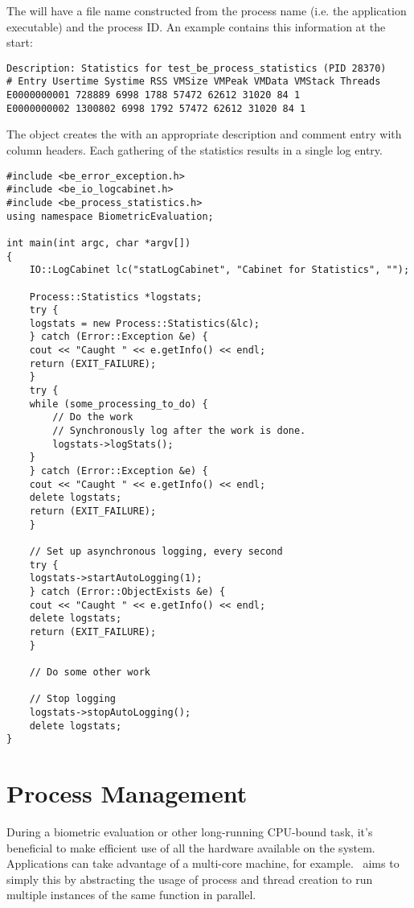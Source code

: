 The  will have a file name constructed from the process name (i.e.
the application executable) and the process ID. An example  contains
this information at the start:

\begin{verbatim}
Description: Statistics for test_be_process_statistics (PID 28370)
# Entry Usertime Systime RSS VMSize VMPeak VMData VMStack Threads
E0000000001 728889 6998 1788 57472 62612 31020 84 1
E0000000002 1300802 6998 1792 57472 62612 31020 84 1
\end{verbatim}

The  object creates the  with an appropriate description
and comment entry with column headers. Each gathering of the statistics results
in a single log entry.

\begin{lstlisting}[caption={Logging Process Statistics}, label=lst:processstatisticslogging]
#include <be_error_exception.h>
#include <be_io_logcabinet.h>
#include <be_process_statistics.h>
using namespace BiometricEvaluation;

int main(int argc, char *argv[])
{
    IO::LogCabinet lc("statLogCabinet", "Cabinet for Statistics", "");

    Process::Statistics *logstats;
    try {
	logstats = new Process::Statistics(&lc);
    } catch (Error::Exception &e) {
	cout << "Caught " << e.getInfo() << endl;
	return (EXIT_FAILURE);
    }
    try {
	while (some_processing_to_do) {
	    // Do the work
	    // Synchronously log after the work is done.
	    logstats->logStats();
	}
    } catch (Error::Exception &e) {
	cout << "Caught " << e.getInfo() << endl;
	delete logstats;
	return (EXIT_FAILURE);
    }

    // Set up asynchronous logging, every second
    try {
	logstats->startAutoLogging(1);
    } catch (Error::ObjectExists &e) {
	cout << "Caught " << e.getInfo() << endl;
	delete logstats;
	return (EXIT_FAILURE);
    }

    // Do some other work

    // Stop logging
    logstats->stopAutoLogging();
    delete logstats;
}
\end{lstlisting}

\section{Process Management}
\label{sec-process_management}

During a biometric evaluation or other long-running CPU-bound task, it's 
beneficial to make efficient use of all the hardware available on the system.
Applications can take advantage of a multi-core machine, for example.
\sname\ aims to simply this by abstracting the usage of process and thread
creation to run multiple instances of the same function in parallel.

